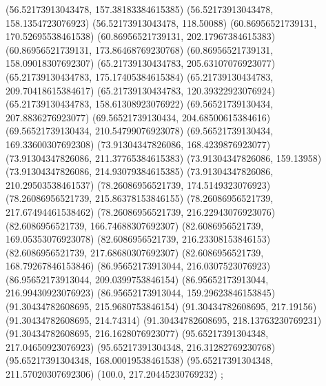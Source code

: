 {{{		(56.52173913043478, 157.38183384615385)
		(56.52173913043478, 158.1354723076923)
		(56.52173913043478, 118.50088)
		(60.86956521739131, 170.52695538461538)
		(60.86956521739131, 202.17967384615383)
		(60.86956521739131, 173.86468769230768)
		(60.86956521739131, 158.09018307692307)
		(65.21739130434783, 205.63107076923077)
		(65.21739130434783, 175.17405384615384)
		(65.21739130434783, 209.70418615384617)
		(65.21739130434783, 120.39322923076924)
		(65.21739130434783, 158.61308923076922)
		(69.56521739130434, 207.8836276923077)
		(69.56521739130434, 204.68500615384616)
		(69.56521739130434, 210.54799076923078)
		(69.56521739130434, 169.33600307692308)
		(73.91304347826086, 168.4239876923077)
		(73.91304347826086, 211.37765384615383)
		(73.91304347826086, 159.13958)
		(73.91304347826086, 214.93079384615385)
		(73.91304347826086, 210.29503538461537)
		(78.26086956521739, 174.5149323076923)
		(78.26086956521739, 215.86378153846155)
		(78.26086956521739, 217.67494461538462)
		(78.26086956521739, 216.22943076923076)
		(82.6086956521739, 166.74688307692307)
		(82.6086956521739, 169.05353076923078)
		(82.6086956521739, 216.23308153846153)
		(82.6086956521739, 217.68680307692307)
		(82.6086956521739, 168.79267846153846)
		(86.95652173913044, 216.0307523076923)
		(86.95652173913044, 209.0399753846154)
		(86.95652173913044, 216.99430923076923)
		(86.95652173913044, 159.29623846153845)
		(91.30434782608695, 215.9680753846154)
		(91.30434782608695, 217.19156)
		(91.30434782608695, 214.74314)
		(91.30434782608695, 218.13763230769231)
		(91.30434782608695, 216.1628076923077)
		(95.65217391304348, 217.04650923076923)
		(95.65217391304348, 216.31282769230768)
		(95.65217391304348, 168.00019538461538)
		(95.65217391304348, 211.57020307692306)
		(100.0, 217.20445230769232)
	};

}}
